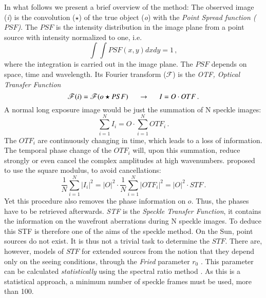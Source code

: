In what follows we present a brief overview of the method:
The observed image (\emph{i}) is the convolution ($\star$) of the true object (\emph{o}) with the \emph{Point Spread function ($PSF$)}. The $PSF$ is the intensity distribution in the image plane from a point source with intensity normalized to one, i.e. 
\begin{equation}
\int\int PSF (x,y) dx dy = 1 \, ,
\end{equation}
where the integration is carried out in the image plane. The $PSF$ depends on space, time and wavelength. Its Fourier transform ($\mathscr{F}$) is the \emph{OTF, Optical Transfer Function}
\begin{equation}
\mathscr{F} ( i ) = \mathscr{F} (o \star PSF ) \hspace{0.5cm} \rightarrow \hspace{0.5cm} I=O \cdot OTF\, .
\label{ec:obs:obser}
\end{equation}
A normal long exposure image would be just the summation of N speckle images:
\begin{equation}
\sum^{N}_{i=1} I_{i} = O \cdot  \sum^{N}_{i=1} OTF_{i} \, .
\label{ec:obs:long}
\end{equation}
The $OTF_{i}$ are continuously changing in time, which leads to a loss of information. The temporal phase change of the $OTF_{i}$ will, upon this summation, reduce strongly or even cancel the complex amplitudes at high wavenumbers. \cite{1970A&A.....6...85L} proposed to use the square modulus, to avoid cancellations:  
\begin{equation}
\frac{1}{N}\sum^{N}_{i=1} |I_{i}|^2 = |O|^{2} \cdot \frac{1}{N} \sum^{N}_{i=1} |OTF_{i}|^2 =  |O|^2 \cdot STF \, .
\label{ec:obs:stf}
\end{equation}
\noindent
Yet this procedure also removes the phase information on $o$. Thus, the phases have to be retrieved afterwards. \emph{STF} is the \emph{Speckle Transfer Function}, it contains the information on the wavefront aberrations during N speckle images. To deduce this STF is therefore one of the aims of the speckle method. On the Sun, point sources do not exist. It is thus not a trivial task to determine the $STF$. There are, however, models of $STF$ for extended sources from the notion that they  depend only on the seeing conditions, through the \emph{Fried} parameter $r_{0}$ \citep{1973JOSA...63..971K}. This parameter can be calculated \emph{statistically} using the spectral ratio method \citep{von-der-Luehe:1984fk}. As this is a statistical approach, a minimum number of speckle frames must be used, more than 100.

